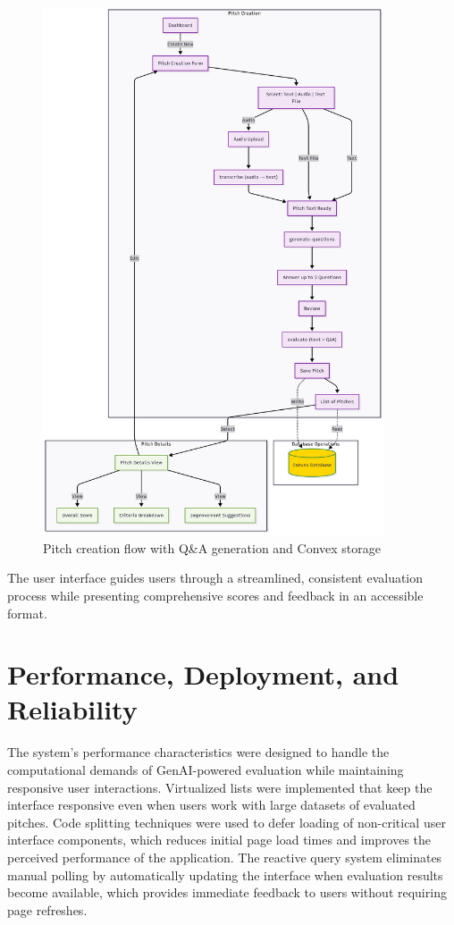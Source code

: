 \begin{figure}[H]
  \centering
  \includegraphics[width=0.9\textwidth]{img/user-flow-pitch}
\caption{Pitch creation flow with Q\&A generation and Convex storage}
  \label{fig:user-flow-pitch}
\end{figure}

The user interface guides users through a streamlined, consistent evaluation process while presenting comprehensive scores and feedback in an accessible format.

\section{Performance, Deployment, and Reliability}

The system's performance characteristics were designed to handle the computational demands of GenAI-powered evaluation while maintaining responsive user interactions. Virtualized lists were implemented that keep the interface responsive even when users work with large datasets of evaluated pitches. Code splitting techniques were used to defer loading of non-critical user interface components, which reduces initial page load times and improves the perceived performance of the application. The reactive query system eliminates manual polling by automatically updating the interface when evaluation results become available, which provides immediate feedback to users without requiring page refreshes.

